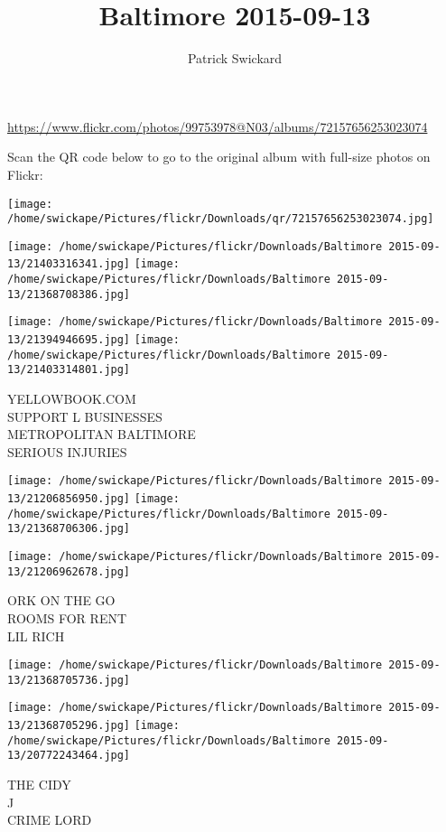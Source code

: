 \documentclass[10pt,letterpaper]{article}
\title{Baltimore 2015-09-13}
\author{Patrick Swickard}
\date{}
\begin{document}
\maketitle

\url{https://www.flickr.com/photos/99753978@N03/albums/72157656253023074}

Scan the QR code below to go to the original album with full-size photos on Flickr:

\texttt{[image: /home/swickape/Pictures/flickr/Downloads/qr/72157656253023074.jpg]}
\pagebreak

\texttt{[image: /home/swickape/Pictures/flickr/Downloads/Baltimore 2015-09-13/21403316341.jpg]}
\texttt{[image: /home/swickape/Pictures/flickr/Downloads/Baltimore 2015-09-13/21368708386.jpg]}

\texttt{[image: /home/swickape/Pictures/flickr/Downloads/Baltimore 2015-09-13/21394946695.jpg]}
\texttt{[image: /home/swickape/Pictures/flickr/Downloads/Baltimore 2015-09-13/21403314801.jpg]}

YELLOWBOOK.COM\\
SUPPORT L BUSINESSES\\
METROPOLITAN BALTIMORE\\
SERIOUS INJURIES
\pagebreak

\texttt{[image: /home/swickape/Pictures/flickr/Downloads/Baltimore 2015-09-13/21206856950.jpg]}
\texttt{[image: /home/swickape/Pictures/flickr/Downloads/Baltimore 2015-09-13/21368706306.jpg]}

\vspace{0.25in}
\texttt{[image: /home/swickape/Pictures/flickr/Downloads/Baltimore 2015-09-13/21206962678.jpg]}

ORK ON THE GO\\
ROOMS FOR RENT\\
LIL RICH
\pagebreak

\texttt{[image: /home/swickape/Pictures/flickr/Downloads/Baltimore 2015-09-13/21368705736.jpg]}

\vspace{0.25in}
\texttt{[image: /home/swickape/Pictures/flickr/Downloads/Baltimore 2015-09-13/21368705296.jpg]}
\texttt{[image: /home/swickape/Pictures/flickr/Downloads/Baltimore 2015-09-13/20772243464.jpg]}

THE CIDY\\
J\\
CRIME LORD
\pagebreak
\end{document}
